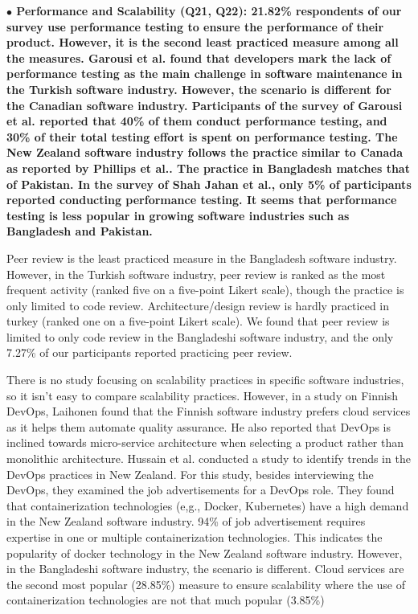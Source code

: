 \nd\bf{$\bullet$ Performance and Scalability (Q21, Q22):} 21.82\% respondents of
our survey use performance testing to ensure the performance of their product.
However, it is
the second least practiced measure among all the measures. Garousi et
al.\citep{Garousi2015} found that developers mark the lack of performance
testing as the main challenge in software maintenance in the Turkish software
industry. However, the scenario is different for the Canadian software industry.
Participants of the survey of Garousi et al.\citep{Garousi2013} reported that
40\% of them conduct performance testing, and 30\% of their total testing effort
is spent on performance testing. The New Zealand software industry follows the
practice similar to Canada as reported by Phillips et al.\citep{Phillips2003}.
The practice in Bangladesh matches that of Pakistan.
In the survey of Shah Jahan et al.\citep{Jahan2019}, only 5\% of participants
reported conducting performance testing. It seems that performance testing is
less popular in growing software industries such as Bangladesh and Pakistan.

Peer review is the least practiced measure in the Bangladesh software industry.
However, in the Turkish software industry, peer review is ranked as the most
frequent activity\citep{Garousi2015} (ranked five on a five-point Likert scale),
though the practice is only limited to code review. Architecture/design review
is hardly practiced in turkey (ranked one on a five-point Likert scale). We
found that peer review is limited to only code review in the Bangladeshi
software industry, and the only 7.27\% of our participants reported practicing
peer review.

There is no study focusing on scalability practices in specific software
industries, so it isn't easy to compare scalability practices. However, in a
study on Finnish DevOps, Laihonen\citep{Laihonen2018} found that the Finnish
software industry prefers cloud services as it helps them automate quality
assurance. He also reported that DevOps is inclined towards micro-service
architecture when selecting a product rather than monolithic architecture.
Hussain et al.\citep{Hussain2017} conducted a study to identify trends in the
DevOps practices in New Zealand. For this study, besides interviewing the
DevOps, they examined the job advertisements for a DevOps role. They found that
containerization technologies (e,g., Docker, Kubernetes) have a high demand in
the New Zealand software industry. 94\% of job advertisement requires expertise
in one or multiple containerization technologies. This indicates the popularity
of docker technology in the New Zealand software industry. However, in the
Bangladeshi software industry, the scenario is different. Cloud services are the
second most popular (28.85\%) measure to ensure scalability where the use of
containerization technologies are not that much popular (3.85\%)

